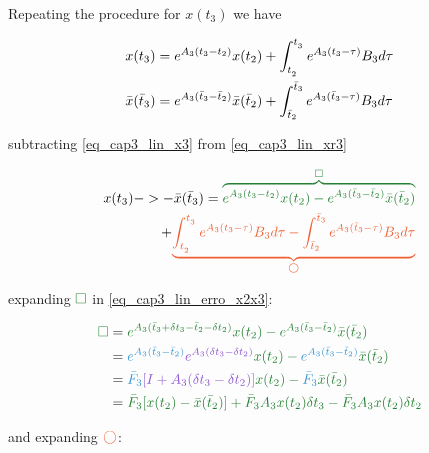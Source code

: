 
Repeating the procedure for $x(t_3)$ we have

\noindent
\begin{align}
	\label{eq_cap3_lin_x3}
	x(t_3)  &= e^{A_3(t_3-t_2)}x(t_2) + \int_{t_{_2}}^{t_{_3}} {e^{A_3(t_{3} - \tau)} B_3 d \tau} \\
	\label{eq_cap3_lin_xr3}
	\bar{x}(\bar{t}_3) &= e^{A_3(\bar{t}_3-\bar{t}_2)}\bar{x}(\bar{t}_2) + \int_{\bar{t}_{2}}^{\bar{t}_{3}} {e^{A_{3}(\bar{t}_{3} - \tau)} B_{3} d \tau}
\end{align}

\noindent
subtracting \eqref{eq_cap3_lin_x3} from \eqref{eq_cap3_lin_xr3} 

\noindent
\begin{equation}
	\label{eq_cap3_lin_erro_x2x3}
	\begin{split}
		x(t_3) ->  - \bar{x}(\bar{t}_3) = \green{\overbrace{e^{A_3(t_3-t_2)}x(t_2) - e^{A_3(\bar{t}_3-\bar{t}_2)}\bar{x}(\bar{t}_2)}^{\square}} \\ 
		+ \orange{\underbrace{\intlinAA{2}{3}{}{} - \intlinAbtt{2}{3}}_{\bigcirc}}
	\end{split}
\end{equation}

\noindent 
expanding $\green{\square}$ in \eqref{eq_cap3_lin_erro_x2x3}:

\noindent
\begin{align}
	\green{ \square } &=
	\green{
		e^{A_3(\bar{t}_3 + \delta t_3 - \bar{t}_2 - \delta t_2)} x(t_2)
		- e^{A_3(\bar{t}_3 - \bar{t}_2)} \bar{x}(\bar{t}_2)
	} \nonumber \\
	&= \green{
		\blue{\Fri{2}{3}} \purple{e^{A_3(\delta t_3 - \delta t_2)}} x(t_2)
		- \blue{\Fri{2}{3}} \bar{x}(\bar{t}_2)
	} \nonumber \\
	&= \green{
		\blue{\bar{F}_3} \purple{[I + A_3(\delta t_3 - \delta t_2)]} x(t_2)
		- \blue{\bar{F}_3} \bar{x}(\bar{t}_2)
	} \nonumber \\
	\label{eq_cap3_lin_x3_green}
	&= \green{
		\bar{F}_3 [x(t_2) - \bar{x}(\bar{t}_2)] + \bar{F}_3 A_3 x(t_2) \delta t_3
		- \bar{F}_3 A_3 x(t_2) \delta t_2
	} 
\end{align}

\noindent 
and expanding $\orange{\bigcirc}$:

